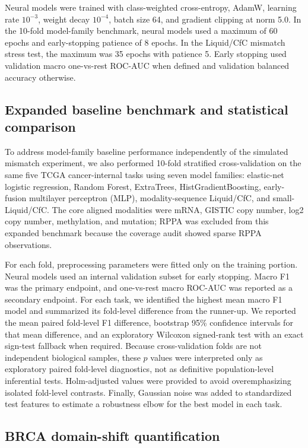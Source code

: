 Neural models were trained with class-weighted cross-entropy, AdamW, learning rate \(10^{-3}\), weight decay \(10^{-4}\), batch size 64, and gradient clipping at norm 5.0. In the 10-fold model-family benchmark, neural models used a maximum of 60 epochs and early-stopping patience of 8 epochs. In the Liquid/CfC mismatch stress test, the maximum was 35 epochs with patience 5. Early stopping used validation macro one-vs-rest ROC-AUC when defined and validation balanced accuracy otherwise.

\subsection{Expanded baseline benchmark and statistical comparison}

To address model-family baseline performance independently of the simulated mismatch experiment, we also performed 10-fold stratified cross-validation on the same five TCGA cancer-internal tasks using seven model families: elastic-net logistic regression, Random Forest, ExtraTrees, HistGradientBoosting, early-fusion multilayer perceptron (MLP), modality-sequence Liquid/CfC, and small-Liquid/CfC. The core aligned modalities were mRNA, GISTIC copy number, log2 copy number, methylation, and mutation; RPPA was excluded from this expanded benchmark because the coverage audit showed sparse RPPA observations.

For each fold, preprocessing parameters were fitted only on the training portion. Neural models used an internal validation subset for early stopping. Macro F1 was the primary endpoint, and one-vs-rest macro ROC-AUC was reported as a secondary endpoint. For each task, we identified the highest mean macro F1 model and summarized its fold-level difference from the runner-up. We reported the mean paired fold-level F1 difference, bootstrap 95\% confidence intervals for that mean difference, and an exploratory Wilcoxon signed-rank test with an exact sign-test fallback when required. Because cross-validation folds are not independent biological samples, these \(p\) values were interpreted only as exploratory paired fold-level diagnostics, not as definitive population-level inferential tests. Holm-adjusted values were provided to avoid overemphasizing isolated fold-level contrasts. Finally, Gaussian noise was added to standardized test features to estimate a robustness elbow for the best model in each task.

\subsection{BRCA domain-shift quantification}

